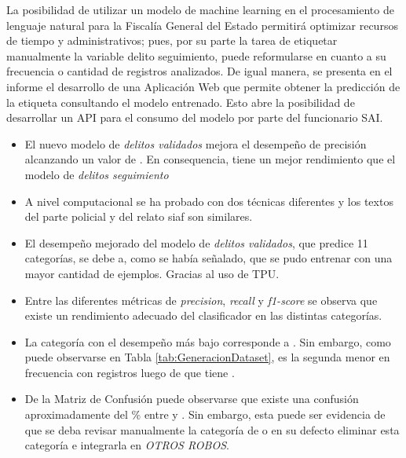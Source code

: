 \documentclass[onecolumn, journal, english, 12pt, a4paper]{IEEEtran} %
\theoremstyle{definition}
\begin{document}
La posibilidad de utilizar un modelo de machine learning en el
procesamiento de lenguaje natural para la Fiscalía General del Estado
permitirá optimizar recursos de tiempo y administrativos; pues, por su
parte la tarea de etiquetar manualmente la variable delito
seguimiento, puede reformularse en cuanto a su frecuencia o cantidad
de registros analizados. De igual manera, se presenta en el informe el
desarrollo de una Aplicación Web que permite obtener la predicción de
la etiqueta consultando el modelo entrenado. Esto abre la posibilidad
de desarrollar un API para el consumo del modelo por parte del
funcionario SAI.
\begin{itemize}
    \item El nuevo modelo de \emph{delitos validados} mejora el
desempeño de precisión alcanzando un valor de . En
consequencia, tiene un mejor rendimiento que el modelo de
\emph{delitos seguimiento}
    \item A nivel computacional se ha probado con dos técnicas
diferentes y los textos del parte policial y del relato siaf son
similares.
    \item El desempeño mejorado del modelo de \emph{delitos
validados}, que predice 11 categorías, se debe a, como se había
señalado, que se pudo entrenar con una mayor cantidad de
ejemplos. Gracias al uso de TPU.
    \item Entre las diferentes métricas de \emph{precision},
\emph{recall} y \emph{f1-score} se observa que existe un rendimiento
adecuado del clasificador en las distintas categorías.
    \item La categoría con el desempeño más bajo corresponde a
. Sin embargo, como puede
observarse en Tabla \ref{tab:GeneracionDataset}, es la segunda menor
en frecuencia con  registros luego de  que tiene
.
    \item De la Matriz de Confusión puede observarse que existe una
confusión aproximadamente del \% entre  y . Sin embargo, esta puede
ser evidencia de que se deba revisar manualmente la categoría de
 o en su defecto eliminar esta categoría e integrarla
en \emph{OTROS ROBOS}.
\end{itemize}

\end{document}
